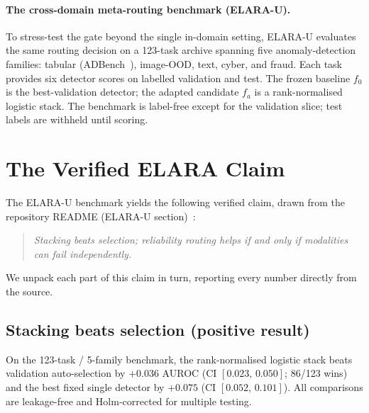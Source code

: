 \paragraph{The cross-domain meta-routing benchmark (ELARA-U).}
To stress-test the gate beyond the single in-domain setting, ELARA-U evaluates the
same routing decision on a 123-task archive spanning five anomaly-detection families:
tabular (ADBench~\cite{han2022adbench}), image-OOD, text, cyber, and fraud.  Each
task provides six detector scores on labelled validation and test.  The frozen
baseline $f_0$ is the best-validation detector; the adapted candidate $f_a$ is a
rank-normalised logistic stack.  The benchmark is label-free except for the
validation slice; test labels are withheld until scoring.

\section{The Verified ELARA Claim}\label{sec:elara-claim}

The ELARA-U benchmark yields the following verified claim, drawn from the
repository README (ELARA-U section)~\cite{kbound2026repo}:

\begin{quote}
\textit{Stacking beats selection; reliability routing helps if and only if
modalities can fail independently.}
\end{quote}

We unpack each part of this claim in turn, reporting every number directly from
the source.

\subsection{Stacking beats selection (positive result)}\label{sec:elara-stacking}

On the 123-task / 5-family benchmark, the rank-normalised logistic stack beats
validation auto-selection by $+0.036$ AUROC (CI $[0.023,\, 0.050]$; 86/123 wins)
and the best fixed single detector by $+0.075$ (CI $[0.052,\, 0.101]$).  All
comparisons are leakage-free and Holm-corrected for multiple testing.

